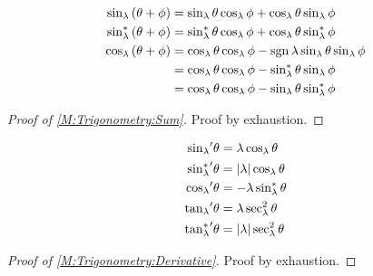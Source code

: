 \documentclass[../methodology.tex]{subfiles}
\begin{document}
\begin{proposition}\label{M:Trigonometry:Sum}
    \begin{align*}
        \sin_\lambda\left(\theta+\phi\right)
         & =\sin_\lambda{\theta}\cos_\lambda{\phi}+\cos_\lambda{\theta}\sin_\lambda{\phi}               \\
        \sin_\lambda^\ast\left(\theta+\phi\right)
         & =\sin_\lambda^\ast{\theta}\cos_\lambda{\phi}+\cos_\lambda{\theta}\sin_\lambda^\ast{\phi}     \\
        \cos_\lambda\left(\theta+\phi\right)
         & =\cos_\lambda{\theta}\cos_\lambda{\phi}-\operatorname{sgn}{\lambda}\sin_\lambda{\theta}\sin_\lambda{\phi} \\
         & =\cos_\lambda{\theta}\cos_\lambda{\phi}-\sin_\lambda^\ast{\theta}\sin_\lambda{\phi}          \\
         & =\cos_\lambda{\theta}\cos_\lambda{\phi}-\sin_\lambda{\theta}\sin_\lambda^\ast{\phi}
    \end{align*}
\end{proposition}
\begin{proof}[Proof of \cref{M:Trigonometry:Sum}]
    Proof by exhaustion.
\end{proof}
\begin{proposition}\label{M:Trigonometry:Derivative}
    \begin{align*}
        {\sin_\lambda}^\prime{\theta}      & =\lambda\cos_\lambda{\theta}         \\
        {\sin_\lambda^\ast}^\prime{\theta} & =\lvert\lambda\rvert\cos_\lambda{\theta}   \\
        {\cos_\lambda}^\prime{\theta}      & =-\lambda\sin_\lambda^\ast{\theta}   \\
        {\tan_\lambda}^\prime{\theta}      & =\lambda\sec_\lambda^2{\theta}       \\
        {\tan_\lambda^\ast}^\prime{\theta} & =\lvert\lambda\rvert\sec_\lambda^2{\theta}
    \end{align*}
\end{proposition}
\begin{proof}[Proof of \cref{M:Trigonometry:Derivative}]
    Proof by exhaustion.
\end{proof}
\end{document}
